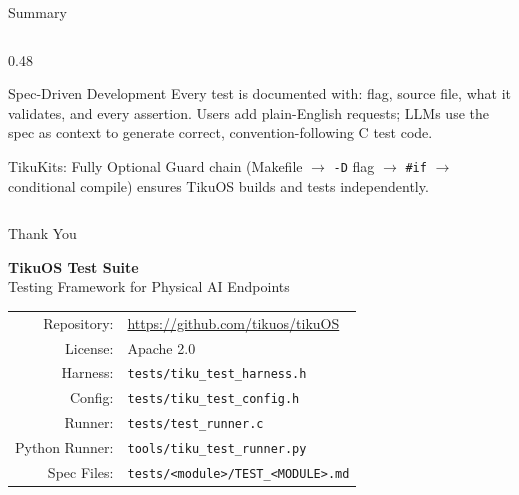 \documentclass[aspectratio=169, 10pt]{beamer}
\begin{document}
\begin{frame}{Summary}
\begin{columns}[T]
\begin{column}{0.48\textwidth}
\vspace{0.3em}
\begin{block}{Spec-Driven Development}
Every test is documented with: flag, source file, what it validates,
and every assertion. Users add plain-English requests; LLMs use the
spec as context to generate correct, convention-following C test code.
\end{block}

\vspace{0.3em}
\begin{alertblock}{TikuKits: Fully Optional}
Guard chain (Makefile $\rightarrow$ \texttt{-D} flag $\rightarrow$ \texttt{\#if} $\rightarrow$
conditional compile) ensures TikuOS builds and tests independently.
\end{alertblock}
\end{column}
\end{columns}
\end{frame}

\begin{frame}{Thank You}
\begin{center}
\Large\textbf{TikuOS Test Suite}\\[0.5em]
\normalsize Testing Framework for Physical AI Endpoints\\[1.5em]

\begin{tabular}{rl}
  Repository:    & \url{https://github.com/tikuos/tikuOS} \\
  License:       & Apache 2.0 \\
  Harness:       & \texttt{tests/tiku\_test\_harness.h} \\
  Config:        & \texttt{tests/tiku\_test\_config.h} \\
  Runner:        & \texttt{tests/test\_runner.c} \\
  Python Runner: & \texttt{tools/tiku\_test\_runner.py} \\
  Spec Files:    & \texttt{tests/<module>/TEST\_<MODULE>.md} \\
\end{tabular}
\end{center}
\end{frame}
\end{document}
